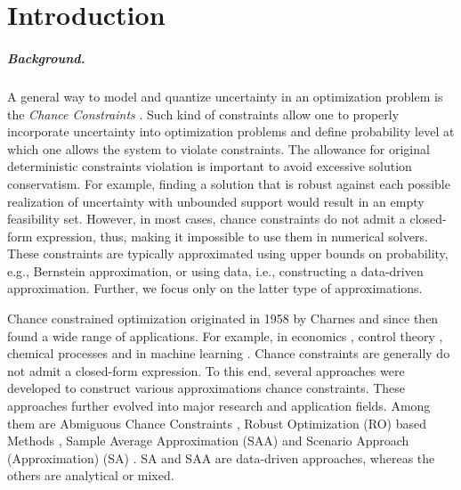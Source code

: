 

\chapter*{Introduction}
\label{chap:Introduction}


\paragraph{Background.}



A general way to model and quantize uncertainty in an optimization problem is the \emph{Chance Constraints} \cite{geng2019data}. Such kind of constraints allow one to properly incorporate uncertainty into optimization problems and define probability level at which one allows the system to violate constraints. The allowance for original deterministic constraints violation is important to avoid excessive solution conservatism. For example, finding a solution that is robust against each possible realization of uncertainty with unbounded support would result in an empty feasibility set. However, in most cases, chance constraints do not admit a closed-form expression, thus, making it impossible to use them in numerical solvers. These constraints are typically approximated using upper bounds on probability, e.g., Bernstein approximation, \cite{nemirovski2007convex} or using data, i.e., constructing a data-driven approximation. Further, we focus only on the latter type of approximations.

Chance constrained optimization originated in 1958 by Charnes \cite{charnes1958cost} and since then found a wide range of applications. For example, in economics \cite{yaari1965uncertain}, control theory \cite{calafiore2006scenario}, chemical processes \cite{sahinidis2004optimization} and in machine learning \cite{bertsimas2018robust,caramanis2011robust}.  Chance constraints are generally do not admit a closed-form expression. To this end, several approaches were developed to construct various approximations chance constraints. These approaches further evolved into major research and application fields. Among them are Abmiguous Chance Constraints \cite{nemirovski2012safe, ben2009robust}, Robust Optimization (RO) based Methods \cite{bertsimas2011theory}, Sample Average Approximation (SAA) \cite{sen1992relaxations, ahmed2008solving} and Scenario Approach (Approximation) (SA) \cite{calafiore2005uncertain}. SA and SAA are data-driven approaches, whereas the others are analytical or mixed.


